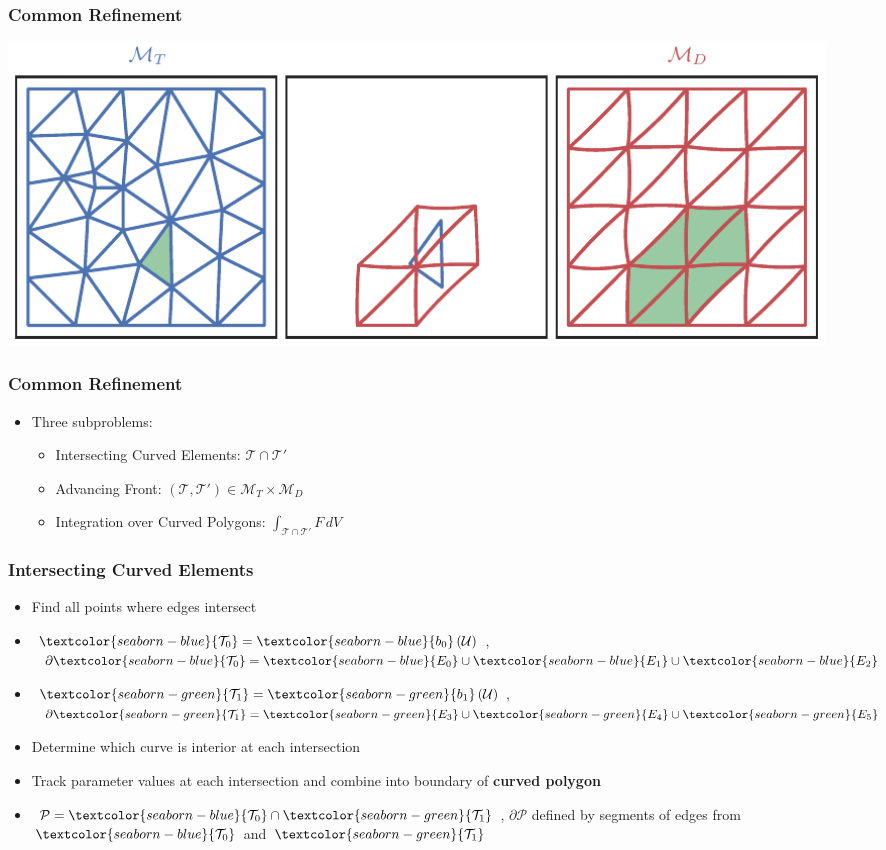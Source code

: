 \documentclass{beamer}
\newcommand{\utri}{\mathcal{U}}
\begin{document}
\begin{frame}
\frametitle{Common Refinement}
\begin{center}
\includegraphics[width=0.95\textwidth]
                {../images/solution-transfer/main_figure02.pdf}
\end{center}
\end{frame}

\begin{frame}
\frametitle{Common Refinement}
\begin{itemize}
\item Three subproblems:
\begin{itemize}
\pause
\item Intersecting Curved Elements: \(\mathcal{T} \cap \mathcal{T}'\)
\pause
\item Advancing Front: \(\left(\mathcal{T}, \mathcal{T}'\right) \in
  \mathcal{M}_T \times \mathcal{M}_D\)
\pause
\item Integration over Curved Polygons:
  \(\displaystyle \int_{\mathcal{T} \cap \mathcal{T}'} F \, dV\)
\end{itemize}
\end{itemize}
\end{frame}

\begin{frame}
\frametitle{Intersecting Curved Elements}
\begin{itemize}
\pause
\item Find all points where edges intersect
\pause
\item \(\textcolor{seaborn-blue}{\mathcal{T}_0} =
  \textcolor{seaborn-blue}{b_0}\left(\utri\right)\),
  \(\partial \textcolor{seaborn-blue}{\mathcal{T}_0} =
  \textcolor{seaborn-blue}{E_0} \cup \textcolor{seaborn-blue}{E_1} \cup
  \textcolor{seaborn-blue}{E_2}\)
\item \(\textcolor{seaborn-green}{\mathcal{T}_1} =
  \textcolor{seaborn-green}{b_1}\left(\utri\right)\),
  \(\partial \textcolor{seaborn-green}{\mathcal{T}_1} =
  \textcolor{seaborn-green}{E_3} \cup \textcolor{seaborn-green}{E_4} \cup
  \textcolor{seaborn-green}{E_5}\)
\pause
\item Determine which curve is interior at each intersection
\pause
\item Track parameter values at each intersection and combine
  into boundary of \textbf{curved polygon}
\pause
\item \(\mathcal{P} = \textcolor{seaborn-blue}{\mathcal{T}_0} \cap
  \textcolor{seaborn-green}{\mathcal{T}_1}\), \(\partial \mathcal{P}\)
  defined by segments of edges from \(\textcolor{seaborn-blue}{\mathcal{T}_0}\)
  and \(\textcolor{seaborn-green}{\mathcal{T}_1}\)
\end{itemize}
\end{frame}
\end{document}
